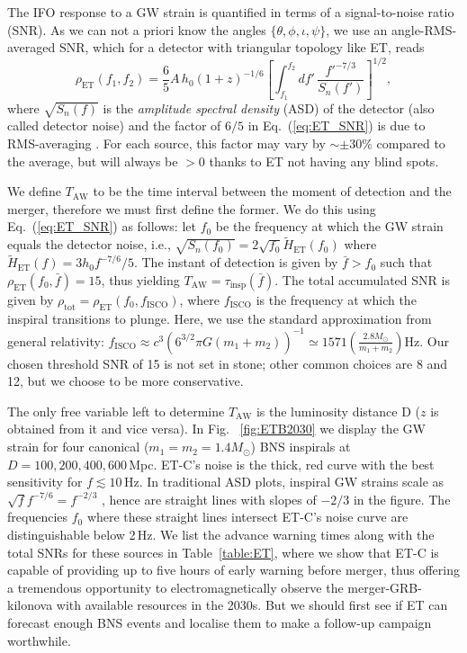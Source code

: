 \documentclass{aa}
\newcommand{\be}{\begin{equation}}
\newcommand{\ee}{\end{equation}}
\newcommand{\f}{\frac}
\begin{document}
The IFO response to a GW strain is quantified in terms of a signal-to-noise ratio (SNR).
As we can not a priori know the angles $\{\theta,\phi,\iota,\psi\}$, we use an angle-RMS-averaged SNR, 
which for a detector with triangular topology like ET, reads
%
\be
\rho_{\text{ET}}(f_1,f_2) = \f{6}{5}A\, h_0  (1+z)^{-1/6} \left[\int_{f_1}^{f_2} d f'\, \f{f'^{-7/3}}{S_n(f')}\right]^{1/2} \label{eq:ET_SNR},
\ee
%
where %
$\sqrt{S_n(f)}$ is the {\it amplitude spectral density} (ASD) of the detector (also called detector noise) and
the factor of $6/5$ in Eq.~(\ref{eq:ET_SNR})
is due to RMS-averaging \citep{Akcay18}. %
For each source, this factor may vary by $\sim \pm 30\%$ compared to the average, 
but will always be $>0$ thanks to ET not having any blind spots.

We define $T_\text{AW}$ to be the time interval between the moment of detection and the merger,
therefore we must first define the former.
We do this using Eq.~(\ref{eq:ET_SNR}) as follows: let $f_0$ be the frequency
at which the GW strain equals the detector noise, i.e., $\sqrt{S_n(f_0)}=2\sqrt{f_0} \tilde{H}_\text{ET}(f_0)$ where $\tilde{H}_\text{ET}(f)=3 h_0 f^{-7/6}/5$.
The instant of detection is given by 
$\bar{f}>f_0$ such that $\rho_\text{ET}(f_0,\bar{f})=15$, thus yielding 
$T_\text{AW} = \tau_\text{insp}(\bar{f})$.
The total accumulated SNR is given by $\rho_\text{tot}=\rho_\text{ET}(f_0, f_\text{ISCO})$, 
where $f_\text{ISCO}$ is the frequency at which the inspiral transitions to plunge. 
Here, we use the standard approximation from general relativity: 
$f_\text{ISCO} \approx {c^3}\left({6^{3/2}\pi G (m_1+m_2)}\right)^{-1} \simeq 1571 \left(\frac{2.8M_\odot}{m_1+m_2}\right)\text{Hz}$. 
Our chosen threshold SNR of 15 is not set in stone;
other common choices are 8 and 12, but we choose to be more conservative.

The only free variable left to determine
$T_\text{AW}$ is the luminosity distance D ($z$ is obtained from it and vice versa). In Fig.~
\ref{fig:ETB2030} we display the GW strain for four canonical ($m_1=m_2=1.4 M_\odot$) BNS inspirals at $D=100,200, 400, 600\,$Mpc. 
ET-C's noise is the thick, red curve with the best sensitivity for $f\lesssim 10\,$Hz. 
In traditional ASD plots, inspiral GW strains scale as $ \sqrt{f} f^{-7/6} = f^{-2/3}$ \citep{Colpi_Sesana},
hence are straight lines with slopes of $-2/3$ in the figure.
The frequencies $f_0$ where these straight lines intersect ET-C's noise curve are distinguishable below 2\,Hz.
We list the advance warning times along with the total SNRs for these sources in  Table~\ref{table:ET}, where
we show that ET-C is capable of providing up to five hours of early warning before merger,
thus offering a tremendous opportunity to electromagnetically observe the merger-GRB-kilonova with available
resources in the 2030s.
But we should first see if ET can forecast enough BNS events and localise them to make a follow-up campaign worthwhile.
\end{document}
